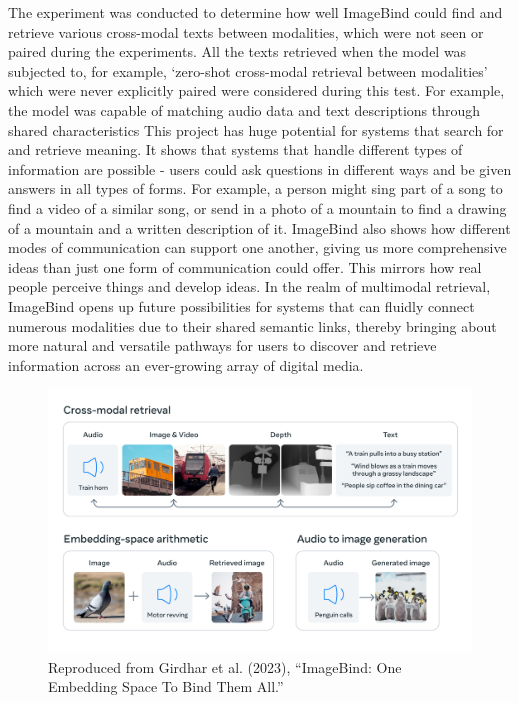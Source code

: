 \documentclass[conference]{IEEEtran}
\begin{document}
\begin{enumerate}
The experiment was conducted to determine how well ImageBind could find and retrieve various cross-modal texts between modalities, which were not seen or paired during the experiments. All the texts retrieved when the model was subjected to, for example, ‘zero-shot cross-modal retrieval between modalities’ which were never explicitly paired were considered during this test. For example, the model was capable of matching audio data and text descriptions through shared characteristics
This project has huge potential for systems that search for and retrieve meaning. It shows that systems that handle different types of information are possible - users could ask questions in different ways and be given answers in all types of forms. For example, a person might sing part of a song to find a video of a similar song, or send in a photo of a mountain to find a drawing of a mountain and a written description of it.
ImageBind also shows how different modes of communication can support one another, giving us more comprehensive ideas than just one form of communication could offer. This mirrors how real people perceive things and develop ideas.
In the realm of multimodal retrieval, ImageBind opens up future possibilities for systems that can fluidly connect numerous modalities due to their shared semantic links, thereby bringing about more natural and versatile pathways for users to discover and retrieve information across an ever-growing array of digital media.

\begin{figure}
    \centering
    \includegraphics[width=1\linewidth]{images/image.png}
    \caption{Reproduced from Girdhar et al. (2023), “ImageBind: One Embedding Space To Bind Them All.”}
    \label{fig:enter-label}
\end{figure}


\end{enumerate}
\end{document}
